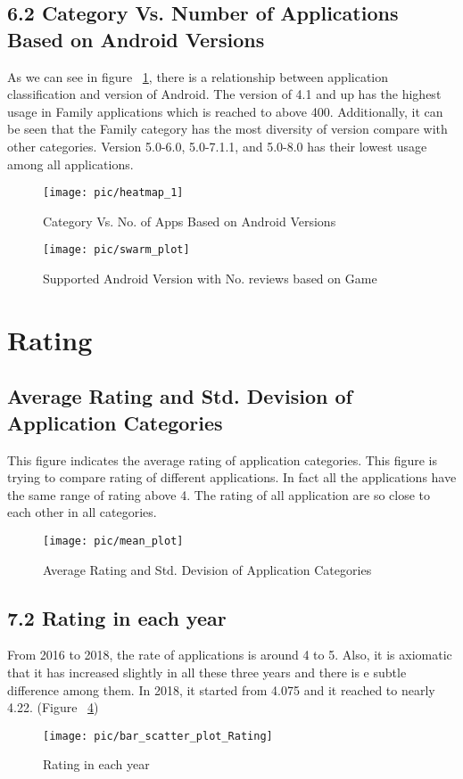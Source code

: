 \documentclass{article}
\begin{document}
\subsection*{6.2 Category Vs. Number of Applications Based on Android Versions}
As we can see in figure ~\ref{fig:12}, there is a relationship between application classification and version of Android. The version of 4.1 and up has the highest usage in Family applications which is reached to above 400. Additionally, it can be seen that the Family category has the most diversity of version compare with other categories. Version 5.0-6.0, 5.0-7.1.1, and 5.0-8.0 has their lowest usage among all applications.
\begin{figure}
\centering
\texttt{[image: pic/heatmap\_1]}
\caption{Category Vs. No. of Apps Based on Android Versions} 
\label{fig:12}
\end{figure}

\begin{figure}
\centering
\texttt{[image: pic/swarm\_plot]}
\caption{Supported Android Version with No. reviews based on Game}
\label{fig:5}
\end{figure}

\section*{Rating}
\subsection*{Average Rating and Std. Devision of Application Categories}
This figure indicates the average rating of application categories. This figure is trying to compare rating of different applications. In fact all the applications have the same range of rating above 4. The rating of all application are so close to each other in all categories.
\begin{figure}
\centering
\texttt{[image: pic/mean\_plot]}
\caption{Average Rating and Std. Devision of Application Categories} 
\label{fig:6}
\end{figure}

\subsection*{7.2 Rating in each year}
From 2016 to 2018, the rate of applications is around 4 to 5. Also, it is axiomatic that it has increased slightly in all these three years and there is e subtle difference among them. In 2018, it started from 4.075 and it reached to nearly 4.22. (Figure ~\ref{fig:7})
\begin{figure}
\centering
\texttt{[image: pic/bar\_scatter\_plot\_Rating]}
\caption{Rating in each year} 
\label{fig:7}
\end{figure}
\end{document}
